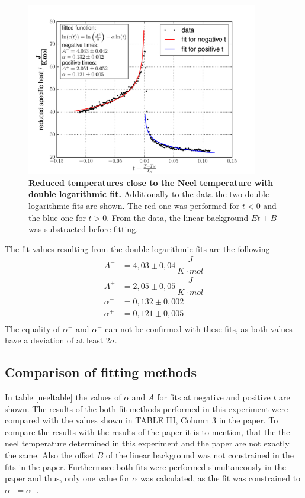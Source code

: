 \documentclass{include/thesisclass3}
\newcommand{\cc}{\cdot}
\newcommand{\e}[1]{\,\si{#1}}
\begin{document}
\begin{figure}[h]
\includegraphics[width = 0.9\textwidth]{fig/loglogfit.pdf}
\caption{\label{neelplot}\textbf{Reduced temperatures close to the Neel temperature with double logarithmic fit.} Additionally to the data the two double logarithmic fits are shown. The red one was performed for $t < 0$ and the blue one for $t > 0$. From the data, the linear background $Et +B$ was substracted before fitting.} 
\end{figure}
The fit values resulting from the double logarithmic fits are the following
\begin{align*}
A^- &= 4,03 \pm 0,04 \e{\dfrac{J}{K\cc mol}}\\
A^+ &= 2,05 \pm 0,05 \e{\dfrac{J}{K\cc mol}}\\
\alpha^- &= 0,132 \pm 0,002\\
\alpha^+ &= 0,121 \pm 0,005\\
\end{align*}
The equality of $\alpha^+$ and $\alpha^-$ can not be confirmed with these fits, as both values have a deviation of at least $2\sigma$.

\subsection{Comparison of fitting methods}
In table \ref{neeltable} the values of $\alpha$ and $A$ for fits at negative and positive $t$ are shown. The results of the both fit methods performed in this experiment were compared with the values shown in TABLE III, Column 3 in the paper. To compare the results with the results of the paper it is to mention, that the the neel temperature determined in this experiment and the paper are not exactly the same. Also  the offset $B$ of the linear background was not constrained in the fits in the paper. Furthermore both fits were performed simultaneously in the paper and thus, only one value for $\alpha$ was calculated, as the fit was constrained to $\alpha^+ = \alpha ^-$.
\end{document}

